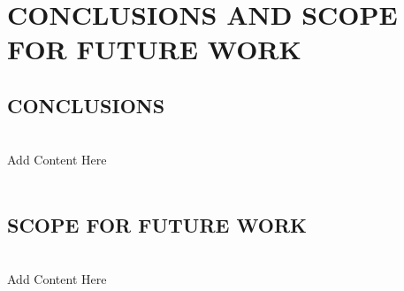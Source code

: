 \chapter{\centering \textbf{\MakeUppercase{Conclusions and Scope for Future Work }}}
\justifying



\section{\textbf{\MakeUppercase{Conclusions}}}
\\Add Content Here\\
\vspace{2.0pt}\\
\section{\textbf{\MakeUppercase{Scope for Future Work}}}
\\Add Content Here\\